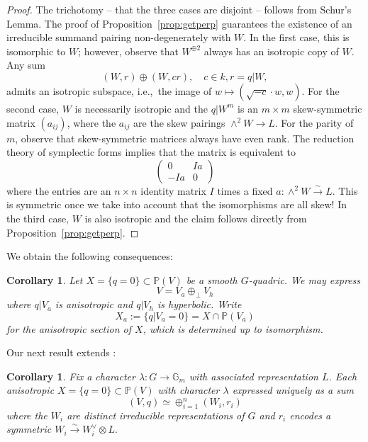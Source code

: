 \documentclass[12pt]{amsart}
\numberwithin{equation}{section}
\newcommand{\lra}{\longrightarrow}
\newcommand{\ra}{\rightarrow}
\newcommand{\bG}{\mathbb{G}}
\newcommand{\bP}{\mathbb{P}}
\theoremstyle{plain}
\newtheorem{coro}[prop]{Corollary}
\theoremstyle{definition}
\theoremstyle{remark}
\begin{document}
\begin{proof}
The trichotomy -- that the three cases are disjoint --
follows from Schur's Lemma. The proof of Proposition~\ref{prop:getperp} guarantees the
existence of an irreducible summand pairing 
non-degenerately with $W$.  In the first case,
this is isomorphic to $W$; however,
observe that $W^{\oplus 2}$ always has an 
isotropic copy of $W$. 
Any sum
$$(W,r) \oplus (W, cr), \quad c\in k, r = q|W,$$
admits an isotropic subspace, i.e.,~the image of 
$w \mapsto (\sqrt{-c} \cdot w,w).$
For the second case,
$W$ is necessarily isotropic and the $q|W^m$ 
is an $m\times m$ skew-symmetric matrix $(a_{ij})$,
where the $a_{ij}$ are the skew pairings 
$\wedge^2 W \rightarrow L$.
For the parity of $m$, observe that skew-symmetric matrices
always have even rank. The reduction theory of 
symplectic forms implies that the matrix is equivalent to
$$\left( \begin{matrix} 0 & Ia \\
            -Ia & 0 \end{matrix} \right)$$
where the entries are an $n\times n$ identity matrix $I$
times a fixed $a:\wedge^2 W\stackrel{\sim}{\ra}L$. 
This is symmetric once we take into account that the 
isomorphisms are all skew!
In the third case, $W$ is
also isotropic and the claim follows 
directly from Proposition~\ref{prop:getperp}.
\end{proof}


We obtain the following consequences:
\begin{coro} \label{coro:anihyp}
Let $X=\{q=0\} \subset \bP(V)$ be a smooth $G$-quadric.  
We may express
$$V = V_a \oplus_{\perp} V_h$$
where $q|V_a$ is anisotropic and $q|V_h$ is hyperbolic.  
Write
$$X_a := \{q|V_a=0\} = X \cap \bP(V_a)$$
for the anisotropic section of $X$, which is 
determined up to isomorphism.
\end{coro}
Our next result extends \cite[Prop.~3.7]{HTEGLDQ}:
\begin{coro} \label{coro:struct}
Fix a character $\lambda:G \ra \bG_m$ with associated representation $L$.
Each anisotropic $X=\{q=0\} \subset \bP(V)$ with 
character $\lambda$
expressed uniquely as a sum
$$(V,q) \simeq \oplus_{i=1}^n (W_i,r_i)$$
where the $W_i$ are distinct irreducible representations of $G$ and
$r_i$ encodes a symmetric
$W_i \stackrel{\sim}{\lra} W_i^{\vee} \otimes L.$
\end{coro}
\end{document}
